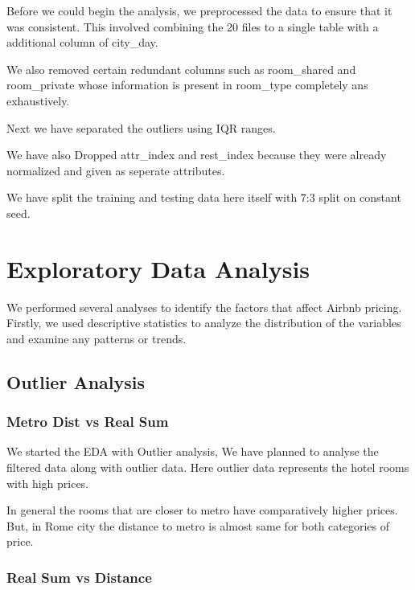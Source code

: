 \documentclass[
]{article}
\begin{document}
Before we could begin the analysis, we preprocessed the data to ensure
that it was consistent. This involved combining the 20 files to a single
table with a additional column of city\_day.

We also removed certain redundant columns such as room\_shared and
room\_private whose information is present in room\_type completely ans
exhaustively.

Next we have separated the outliers using IQR ranges.

We have also Dropped attr\_index and rest\_index because they were
already normalized and given as seperate attributes.

We have split the training and testing data here itself with 7:3 split
on constant seed.

\hypertarget{exploratory-data-analysis}{%
\section{Exploratory Data Analysis}\label{exploratory-data-analysis}}

We performed several analyses to identify the factors that affect Airbnb
pricing. Firstly, we used descriptive statistics to analyze the
distribution of the variables and examine any patterns or trends.

\hypertarget{outlier-analysis}{%
\subsection{Outlier Analysis}\label{outlier-analysis}}

\hypertarget{metro-dist-vs-real-sum}{%
\subsubsection{Metro Dist vs Real Sum}\label{metro-dist-vs-real-sum}}

We started the EDA with Outlier analysis, We have planned to analyse the
filtered data along with outlier data. Here outlier data represents the
hotel rooms with high prices.

In general the rooms that are closer to metro have comparatively higher
prices. But, in Rome city the distance to metro is almost same for both
categories of price.

\hypertarget{real-sum-vs-distance}{%
\subsubsection{Real Sum vs Distance}\label{real-sum-vs-distance}}
\end{document}
